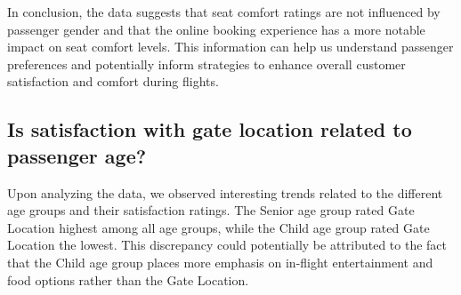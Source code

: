 \documentclass[11pt]{article}
\begin{document}
In conclusion, the data suggests that seat comfort ratings are not influenced by passenger gender and that the online booking experience has a more notable impact on seat comfort levels. This information can help us understand passenger preferences and potentially inform strategies to enhance overall customer satisfaction and comfort during flights.

        

        


    \hypertarget{question-7.2}{%
\subsection{Is satisfaction with gate location related to passenger
age?}\label{question-7.2}}

Upon analyzing the data, we observed interesting trends related to the different age groups and their satisfaction ratings. The Senior age group rated Gate Location highest among all age groups, while the Child age group rated Gate Location the lowest. This discrepancy could potentially be attributed to the fact that the Child age group places more emphasis on in-flight entertainment and food options rather than the Gate Location.
\end{document}
